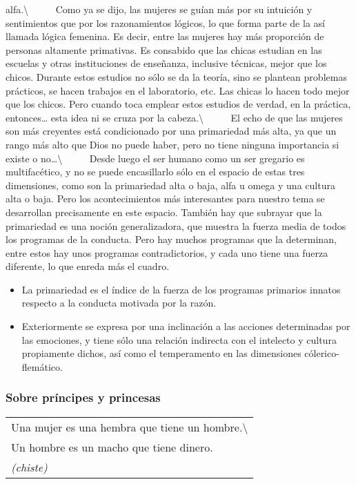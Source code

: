 alfa.\textbackslash{} ~ ~ ~ Como ya se dijo, las mujeres se guían más
por su intuición y sentimientos que por los razonamientos lógicos, lo
que forma parte de la así llamada lógica femenina. Es decir, entre las
mujeres hay más proporción de personas altamente primativas. Es
consabido que las chicas estudian en las escuelas y otras instituciones
de enseñanza, inclusive técnicas, mejor que los chicos. Durante estos
estudios no sólo se da la teoría, sino se plantean problemas prácticos,
se hacen trabajos en el laboratorio, etc. Las chicas lo hacen todo mejor
que los chicos. Pero cuando toca emplear estos estudios de verdad, en la
práctica, entonces\ldots{} esta idea ni se cruza por la
cabeza.\textbackslash{} ~ ~ ~ El echo de que las mujeres son más
creyentes está condicionado por una primariedad más alta, ya que un
rango más alto que Dios no puede haber, pero no tiene ninguna
importancia si existe o no\ldots{}\textbackslash{} ~ ~ ~ Desde luego el
ser humano como un ser gregario es multifacético, y no se puede
encasillarlo sólo en el espacio de estas tres dimensiones, como son la
primariedad alta o baja, alfa u omega y una cultura alta o baja. Pero
los acontecimientos más interesantes para nuestro tema se desarrollan
precisamente en este espacio. También hay que subrayar que la
primariedad es una noción generalizadora, que muestra la fuerza media de
todos los programas de la conducta. Pero hay muchos programas que la
determinan, entre estos hay unos programas contradictorios, y cada uno
tiene una fuerza diferente, lo que enreda más el cuadro.

\begin{itemize}
\tightlist
\item
  La primariedad es el índice de la fuerza de los programas primarios
  innatos respecto a la conducta motivada por la razón.
\item
  Exteriormente se expresa por una inclinación a las acciones
  determinadas por las emociones, y tiene sólo una relación indirecta
  con el intelecto y cultura propiamente dichos, así como el
  temperamento en las dimensiones cólerico-flemático.
\end{itemize}

\protect\hypertarget{M10}{}{}

\subsubsection{Sobre príncipes y
princesas}\label{sobre-pruxedncipes-y-princesas}

\begin{longtable}[]{@{}l@{}}
\toprule
Una mujer es una hembra que tiene un
hombre.\textbackslash{}\tabularnewline
Un hombre es un macho que tiene dinero.\tabularnewline
\emph{(chiste)}\tabularnewline
\bottomrule
\end{longtable}


